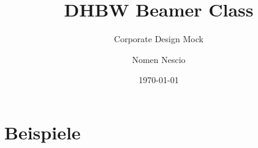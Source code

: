 \documentclass[smaller]{DHBW} %
\title{DHBW Beamer Class}
\subtitle{Corporate Design Mock}
\author{Nomen Nescio}
\institute[DHBW Karlsruhe]{karlsruhe.dhbw.de}
\date{\today}
\begin{document}
  \part{Beispiele}
  
\end{document}
